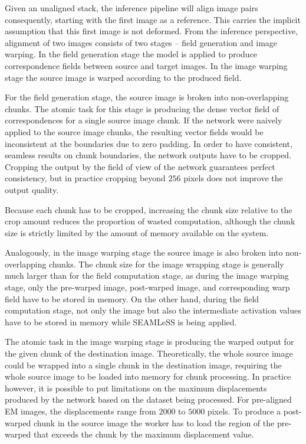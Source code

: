 \documentclass{article}
\begin{document}
Given an unaligned stack, the inference pipeline will align image pairs consequently, starting with the first image as a reference. This carries the implicit assumption that this first image is not deformed. From the inference perspective, alignment of two images consists of two stages -- field generation and image warping. In the field generation stage the model is applied to produce correspondence fields between source and target images. In the image warping stage the source image is warped according to the produced field. 

For the field generation stage, the source image is broken into non-overlapping chunks. The atomic task for this stage is producing the dense vector field of correspondences for a single source image chunk. If the network were naively applied to the source image chunks, the resulting vector fields would be inconsistent at the boundaries due to zero padding. In order to have consistent, seamless results on chunk boundaries, the network outputs have to be cropped. Cropping the output by the field of view of the network guarantees perfect consistency, but in practice cropping beyond $256$ pixels does not improve the output quality.

Because each chunk has to be cropped, increasing the chunk size relative to the crop amount reduces the proportion of wasted computation, although the chunk size is strictly limited by the amount of memory available on the system.

Analogously, in the image warping stage the source image is also broken into non-overlapping chunks. The chunk size for the image wrapping stage is generally much larger than for the field computation stage, as during the image warping stage, only the pre-warped image, post-warped image, and corresponding warp field have to be stored in memory. On the other hand, during the field computation stage, not only the image but also the intermediate activation values have to be stored in memory while SEAMLeSS is being applied. 

The atomic task in the image warping stage is producing the warped output for the given chunk of the destination image. Theoretically, the whole source image could be wrapped into a single chunk in the destination image, requiring the whole source image to be loaded into memory for chunk processing. In practice however, it is possible to put limitations on the maximum displacements produced by the network based on the dataset being processed. For pre-aligned EM images, the displacements range from $2000$ to $5000$ pixels. To produce a post-warped chunk in the source image the worker has to load the region of the pre-warped that exceeds the chunk by the maximum displacement value. 
\end{document}

